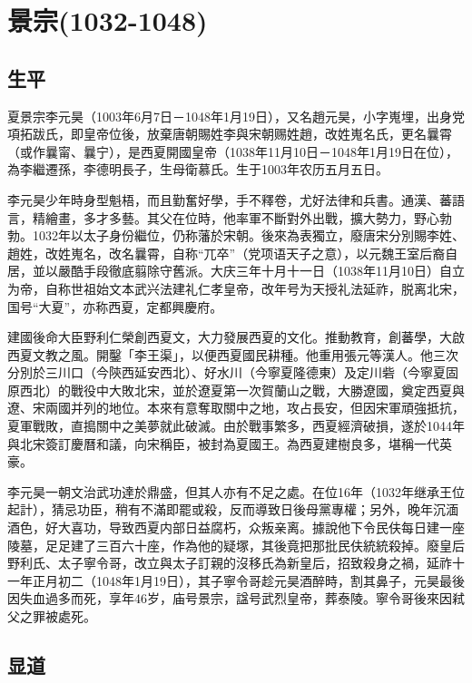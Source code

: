 
\section{景宗\tiny(1032-1048)}

\subsection{生平}

夏景宗李元昊（1003年6月7日－1048年1月19日），又名趙元昊，小字嵬埋，出身党項拓跋氏，即皇帝位後，放棄唐朝賜姓李與宋朝赐姓趙，改姓嵬名氏，更名曩霄（或作曩甯、曩宁），是西夏開國皇帝（1038年11月10日－1048年1月19日在位），為李繼遷孫，李德明長子，生母衛慕氏。生于1003年农历五月五日。

李元昊少年時身型魁梧，而且勤奮好學，手不釋卷，尤好法律和兵書。通漢、蕃語言，精繪畫，多才多藝。其父在位時，他率軍不斷對外出戰，擴大勢力，野心勃勃。1032年以太子身份繼位，仍称藩於宋朝。後來為表獨立，廢唐宋分別賜李姓、趙姓，改姓嵬名，改名曩霄，自称“兀卒”（党项语天子之意），以元魏王室后裔自居，並以嚴酷手段徹底翦除守舊派。大庆三年十月十一日（1038年11月10日）自立为帝，自称世祖始文本武兴法建礼仁孝皇帝，改年号为天授礼法延祚，脱离北宋，国号“大夏”，亦称西夏，定都興慶府。

建國後命大臣野利仁榮創西夏文，大力發展西夏的文化。推動教育，創蕃學，大啟西夏文教之風。開鑿「李王渠」，以便西夏國民耕種。他重用張元等漢人。他三次分別於三川口（今陝西延安西北）、好水川（今寧夏隆德東）及定川砦（今寧夏固原西北）的戰役中大敗北宋，並於遼夏第一次賀蘭山之戰，大勝遼國，奠定西夏與遼、宋兩國并列的地位。本來有意奪取關中之地，攻占長安，但因宋軍頑強抵抗，夏軍戰敗，直搗關中之美夢就此破滅。由於戰事繁多，西夏經濟破損，遂於1044年與北宋簽訂慶曆和議，向宋稱臣，被封為夏國王。為西夏建樹良多，堪稱一代英豪。

李元昊一朝文治武功達於鼎盛，但其人亦有不足之處。在位16年（1032年继承王位起計），猜忌功臣，稍有不滿即罷或殺，反而導致日後母黨專權；另外，晚年沉湎酒色，好大喜功，导致西夏内部日益腐朽，众叛亲离。據說他下令民伕每日建一座陵墓，足足建了三百六十座，作為他的疑塚，其後竟把那批民伕統統殺掉。廢皇后野利氏、太子寧令哥，改立與太子訂親的沒移氏為新皇后，招致殺身之禍，延祚十一年正月初二（1048年1月19日），其子寧令哥趁元昊酒醉時，割其鼻子，元昊最後因失血過多而死，享年46岁，庙号景宗，諡号武烈皇帝，葬泰陵。寧令哥後來因弒父之罪被處死。

\subsection{显道}

